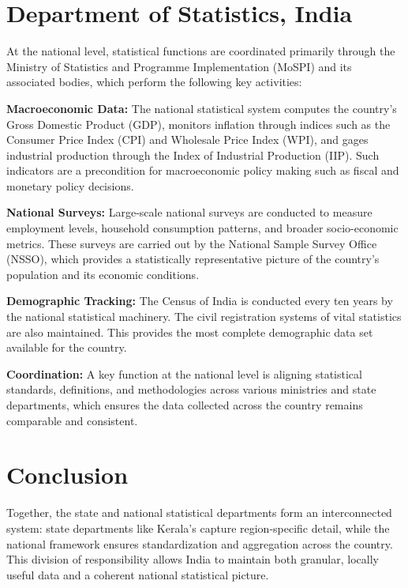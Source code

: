 \documentclass[12pt]{article}
\begin{document}
\section*{Department of Statistics, India}
At the national level, statistical functions are coordinated primarily through the Ministry of Statistics and Programme Implementation (MoSPI) and its associated bodies, which perform the following key activities:

\textbf{Macroeconomic Data:} The national statistical system computes the country’s Gross Domestic Product (GDP), monitors inflation through indices such as the Consumer Price Index (CPI) and Wholesale Price Index (WPI), and gages industrial production through the Index of Industrial Production (IIP). Such indicators are a precondition for macroeconomic policy making such as fiscal and monetary policy decisions.

\textbf{National Surveys:} Large-scale national surveys are conducted to measure employment levels, household consumption patterns, and broader socio-economic metrics. These surveys are carried out by the National Sample Survey Office (NSSO), which provides a statistically representative picture of the country's population and its economic conditions.

\textbf{Demographic Tracking:} The Census of India is conducted every ten years by the national statistical machinery. The civil registration systems of vital statistics are also maintained. This provides the most complete demographic data set available for the country.

\textbf{Coordination:} A key function at the national level is aligning statistical standards, definitions, and methodologies across various ministries and state departments, which ensures the data collected across the country remains comparable and consistent.

\section*{Conclusion}
Together, the state and national statistical departments form an interconnected system: state departments like Kerala's capture region-specific detail, while the national framework ensures standardization and aggregation across the country. This division of responsibility allows India to maintain both granular, locally useful data and a coherent national statistical picture.
\end{document}
